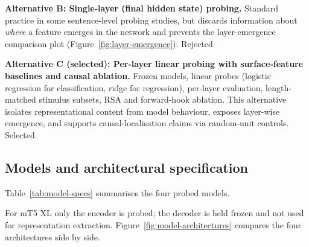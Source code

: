 \textbf{Alternative B: Single-layer (final hidden state) probing.} Standard practice in some sentence-level probing studies, but discards information about \emph{where} a feature emerges in the network and prevents the layer-emergence comparison plot (Figure~\ref{fig:layer-emergence}). Rejected.

\textbf{Alternative C (selected): Per-layer linear probing with surface-feature baselines and causal ablation.} Frozen models, linear probes (logistic regression for classification, ridge for regression), per-layer evaluation, length-matched stimulus subsets, RSA and forward-hook ablation. This alternative isolates representational content from model behaviour, exposes layer-wise emergence, and supports causal-localisation claims via random-unit controls. Selected.

\subsection{Models and architectural specification}

Table~\ref{tab:model-specs} summarises the four probed models.

\begin{table}[H]
\centering
\caption{Architectural specification of the four probed multilingual LLMs.}
\label{tab:model-specs}
\small
{}
\end{table}

For mT5 XL only the encoder is probed; the decoder is held frozen and not used for representation extraction. Figure~\ref{fig:model-architectures} compares the four architectures side by side.

